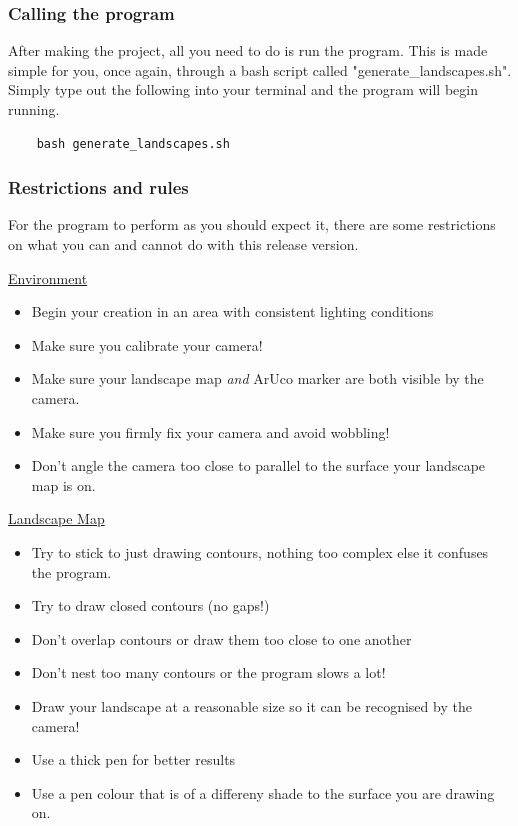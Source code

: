\documentclass[11pt]{article}
\begin{document}
\subsubsection*{Calling the program}
After making the project, all you need to do is run the program. This
is made simple for you, once again, through a bash script called
"generate\_landscapes.sh". Simply type out the following into
your terminal and the program will begin running.

\begin{verbatim}
	bash generate_landscapes.sh
\end{verbatim}

\subsubsection*{Restrictions and rules}
For the program to perform as you should expect it, there are some 
restrictions on what you can and cannot do with this release version.

\underline{Environment}\\
\begin{itemize}
	\item Begin your creation in an area with consistent lighting conditions
	\item Make sure you calibrate your camera!
	\item Make sure your landscape map \textit{and} ArUco marker are both
			visible by the camera.
	\item Make sure you firmly fix your camera and avoid wobbling!
	\item Don't angle the camera too close to parallel to the surface
			your landscape map is on.
\end{itemize}

\underline{Landscape Map}\\
\begin{itemize}
	\item Try to stick to just drawing contours, nothing too complex else
			it confuses the program.
	\item Try to draw closed contours (no gaps!)
	\item Don't overlap contours or draw them too close to one another
	\item Don't nest too many contours or the program slows a lot!
	\item Draw your landscape at a reasonable size so it can be
			recognised by the camera!
	\item Use a thick pen for better results
	\item Use a pen colour that is of a differeny shade to the surface
			you are drawing on.
\end{itemize}
\end{document}

